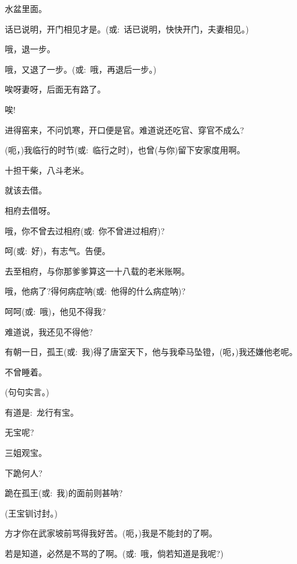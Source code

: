 {{{{水盆里面。}

{话已说明，开门相见才是。({\akai 或}:~话已说明，快快开门，夫妻相见。)}

{哦，退一步。}

{哦，又退了一步。({\akai 或}:~哦，再退后一步。)}

{唉呀妻呀，后面无有路了。}

{唉!}


{ }

{进得窑来，不问饥寒，开口便是官。难道说还吃官、穿官不成么?}

{(呃，)我临行的时节({\akai 或}:~临行之时)，也曾(与你)留下安家度用啊。}

{十担干柴，八斗老米。}

{就该去借。}

{相府去借呀。}

{哦，你不曾去过相府({\akai 或}:~你不曾进过相府)?}

{呵({\akai 或}:~好)，有志气。告便。}

{去至相府，与你那爹爹算这一十八载的老米账啊。}

{哦，他病了?得何病症呐({\akai 或}:~他得的什么病症呐)?}

{呵呵({\akai 或}:~哦)，他见不得我?}

{难道说，我还见不得他?}

{有朝一日，孤王({\akai 或}:~我)得了唐室天下，他与我牵马坠镫，(呃，)我还嫌他老呢。}

{不曾睡着。}

{(句句实言。)}

{有道是:~龙行有宝。}

{无宝呢?}

{三姐观宝。}


{下跪何人?}

{跪在孤王({\akai 或}:~我)的面前则甚呐?}

{(王宝钏\hspace{20pt}讨封。)}

{方才你在武家坡前骂得我好苦。(呃，)我是不能封的了啊。}

{若是知道，必然是不骂的了啊。({\akai 或}:~哦，倘若知道是我呢?)}

}}}
